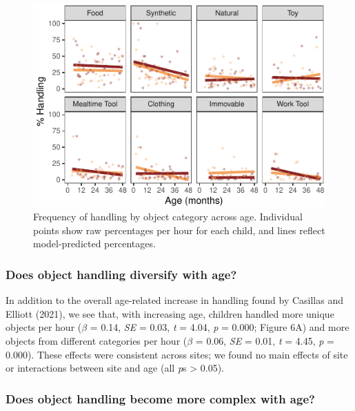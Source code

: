 \documentclass[10pt, letterpaper]{article}
\newenvironment{CodeChunk}{}{}
\begin{document}
\begin{CodeChunk}
\begin{figure}[!ht]

{\centering \includegraphics{figs/age-effects-bycategory-fig-1} 

}

\caption[Frequency of handling by object category across age]{Frequency of handling by object category across age. Individual points show raw percentages per hour for each child, and lines reflect model-predicted percentages.}\label{fig:age-effects-bycategory-fig}
\end{figure}
\end{CodeChunk}

\hypertarget{does-object-handling-diversify-with-age}{%
\subsubsection{Does object handling diversify with
age?}\label{does-object-handling-diversify-with-age}}

In addition to the overall age-related increase in handling found by
Casillas and Elliott (2021), we see that, with increasing age, children
handled more unique objects per hour (\(\beta\) = 0.14, \emph{SE} =
0.03, \emph{t} = 4.04, \emph{p} = 0.000; Figure 6A) and more objects
from different categories per hour (\(\beta\) = 0.06, \emph{SE} = 0.01,
\emph{t} = 4.45, \emph{p} = 0.000). These effects were consistent across
sites; we found no main effects of site or interactions between site and
age (all \emph{p}s \textgreater{} 0.05).

\hypertarget{does-object-handling-become-more-complex-with-age}{%
\subsubsection{Does object handling become more complex with
age?}\label{does-object-handling-become-more-complex-with-age}}
\end{document}

